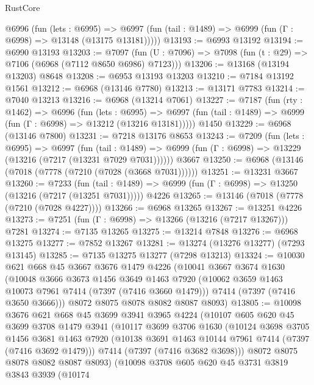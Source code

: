 \begin{lexlean}{RustCore}
\begin{coremodule}
    @6996
      (fun (lets : @6995) =>
      @6997 (fun (tail : @1489) => @6999 (fun (Γ : @6998) => @13148 (@13175 @13181)))))
@13193 := @6993 @13192
@13194 := @6990 @13193
@13203 := @7097
    (fun (U : @7096) => @7098 (fun (t : @29) => @7106 (@6968 (@7112 @8650 @6986) @7123)))
@13206 := @13168 (@13194 @13203) @8648
@13208 := @6953 @13193 @13203
@13210 := @7184 @13192 @1561
@13212 := @6968 (@13146 @7780)
@13213 := @13171 @7783
@13214 := @7040 @13213
@13216 := @6968 (@13214 @7061)
@13227 := @7187
    (fun (rty : @1462) =>
    @6996
      (fun (lets : @6995) =>
      @6997 (fun (tail : @1489) => @6999 (fun (Γ : @6998) => @13212 (@13216 @13181)))))
    @1450
@13229 := @6968 (@13146 @7800)
@13231 := @7218 @13176 @8653
@13243 := @7209
    (fun (lets : @6995) =>
    @6997
      (fun (tail : @1489) =>
      @6999 (fun (Γ : @6998) => @13229 (@13216 (@7217 (@13231 @7029 @7031))))))
    @3667
@13250 := @6968 (@13146 (@7018 (@7778 (@7210 (@7028 (@3668 @7031))))))
@13251 := @13231 @3667
@13260 := @7233
    (fun (tail : @1489) => @6999 (fun (Γ : @6998) => @13250 (@13216 (@7217 (@13251 @7031)))))
    @4226
@13265 := @13146 (@7018 (@7778 (@7210 (@7028 @4227))))
@13266 := @6968 @13265
@13267 := @13251 @4226
@13273 := @7251 (fun (Γ : @6998) => @13266 (@13216 (@7217 @13267))) @7281
@13274 := @7135 @13265
@13275 := @13214 @7848
@13276 := @6968 @13275
@13277 := @7852 @13267
@13281 := @13274 (@13276 @13277) (@7293 @13145)
@13285 := @7135 @13275 @13277 (@7298 @13213)
@13324 := @10030
    @621
    @668
    @45
    @3667
    @3676
    @1479
    @4226
    (@10041
      @3667
      @3674
      @1630
      (@10048
        @3666
        @3673
        @1456
        @3649
        @1463
        @7920
        (@10062 @3659 @1463 @10073 @7961 @7414 (@7397 (@7416 @3660 @1479)))
        @7414
        (@7397 (@7416 @3650 @3666)))
      @8072
      @8075
      @8078
      @8082
      @8087
      @8093)
@13805 := @10098
    @3676
    @621
    @668
    @45
    @3699
    @3941
    @3965
    @4224
    (@10107
      @605
      @620
      @45
      @3699
      @3708
      @1479
      @3941
      (@10117
        @3699
        @3706
        @1630
        (@10124
          @3698
          @3705
          @1456
          @3681
          @1463
          @7920
          (@10138 @3691 @1463 @10144 @7961 @7414 (@7397 (@7416 @3692 @1479)))
          @7414
          (@7397 (@7416 @3682 @3698)))
        @8072
        @8075
        @8078
        @8082
        @8087
        @8093)
      (@10098
        @3708
        @605
        @620
        @45
        @3731
        @3819
        @3843
        @3939
        (@10174

\end{coremodule}
\end{lexlean}
